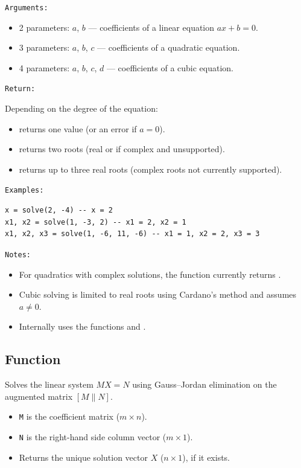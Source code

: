 \medskip
\texttt{Arguments: }

\begin{itemize}
\item 2 parameters: $a$, $b$ — coefficients of a linear equation $ax + b = 0$.
\item 3 parameters: $a$, $b$, $c$ — coefficients of a quadratic equation.
\item 4 parameters: $a$, $b$, $c$, $d$ — coefficients of a cubic equation.
\end{itemize}

\medskip
\texttt{Return: }

Depending on the degree of the equation:
\begin{itemize}
\item {} returns one value (or an error if $a = 0$).
\item {} returns two roots (real or  if complex and unsupported).
\item {} returns up to three real roots (complex roots not currently supported).
\end{itemize}

\medskip
\texttt{Examples: }

\begin{verbatim}
x = solve(2, -4) -- x = 2
x1, x2 = solve(1, -3, 2) -- x1 = 2, x2 = 1
x1, x2, x3 = solve(1, -6, 11, -6) -- x1 = 1, x2 = 2, x3 = 3
\end{verbatim}

\medskip
\texttt{Notes: }

\begin{itemize}
\item For quadratics with complex solutions, the function currently returns .
\item Cubic solving is limited to real roots using Cardano's method and assumes $a \ne 0$.
\item Internally uses the functions  and .
\end{itemize}

\subsection{Function }
Solves the linear system $MX = N$ using Gauss–Jordan elimination on the augmented matrix $[M\|N]$.

\begin{itemize}
\item \texttt{M} is the coefficient matrix ($m \times n$).
\item \texttt{N} is the right-hand side column vector ($m \times 1$).
\item Returns the unique solution vector $X$ ($n \times 1$), if it exists.
\end{itemize}

